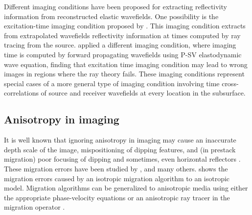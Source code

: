 Different imaging conditions have been proposed for extracting
reflectivity information from reconstructed elastic wavefields. One possibility is
the excitation-time imaging condition proposed by
\cite{chang:67}.  This imaging condition extracts from extrapolated wavefields reflectivity information at times computed by
ray tracing from the source.
\cite{SEG-1991-1009} applied a different imaging condition, where imaging time is computed by forward propagating wavefields using P-SV elastodynamic wave equation, finding that excitation time imaging condition may lead to wrong images in regions where the ray theory fails. These imaging conditions represent special cases of a more general type of imaging condition involving time cross-correlations of source and receiver wavefields at every location in the subsurface.


\subsection{Anisotropy in imaging}

It is well known that ignoring anisotropy in imaging may cause an inaccurate depth scale of the image, mispositioning of dipping features, and (in prestack migration) poor focusing of dipping and sometimes, even horizontal reflectors \cite[]{tsvankin.2001}. These migration errors have been studied by \cite{larner:1454}, \cite{alkhalifah:1405} and many others.  shows the migration errors caused by an isotropic migration algorithm to an isotropic model. Migration algorithms can be generalized to anisotropic media using either the appropriate phase-velocity equations or an anisotropic ray tracer in the migration operator \cite[]{tsvankin.2001}.


 
